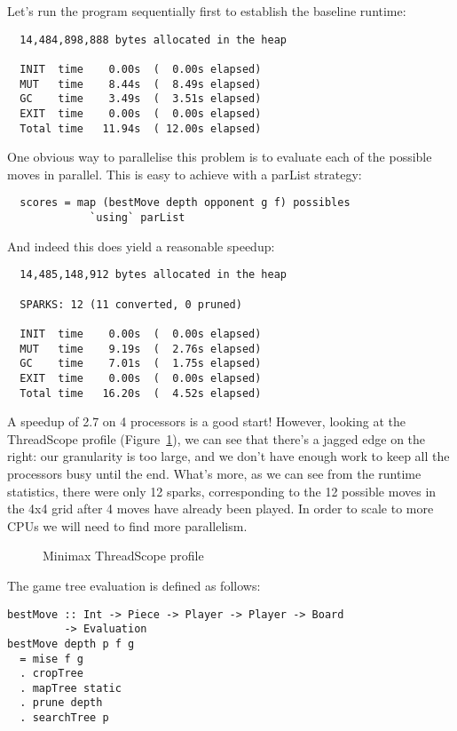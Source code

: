 \documentclass[twocolumn,9pt]{sigplanconf}
\newcommand{\codef}[1]{{\fontfamily{cmss}\small#1}}
\begin{document}
Let's run the program sequentially first to establish the baseline
runtime:

\begin{verbatim}
  14,484,898,888 bytes allocated in the heap

  INIT  time    0.00s  (  0.00s elapsed)
  MUT   time    8.44s  (  8.49s elapsed)
  GC    time    3.49s  (  3.51s elapsed)
  EXIT  time    0.00s  (  0.00s elapsed)
  Total time   11.94s  ( 12.00s elapsed)
\end{verbatim}

One obvious way to parallelise this problem is to evaluate each of the
possible moves in parallel.  This is easy to achieve with a
\codef{parList} strategy:

\begin{lstlisting}
  scores = map (bestMove depth opponent g f) possibles
             `using` parList
\end{lstlisting}

And indeed this does yield a reasonable speedup:

\begin{verbatim}
  14,485,148,912 bytes allocated in the heap

  SPARKS: 12 (11 converted, 0 pruned)

  INIT  time    0.00s  (  0.00s elapsed)
  MUT   time    9.19s  (  2.76s elapsed)
  GC    time    7.01s  (  1.75s elapsed)
  EXIT  time    0.00s  (  0.00s elapsed)
  Total time   16.20s  (  4.52s elapsed)
\end{verbatim}

A speedup of 2.7 on 4 processors is a good start!  However, looking at
the ThreadScope profile (Figure~\ref{f:minimax-threadscope1}), we can
see that there's a jagged edge on the right: our granularity is too
large, and we don't have enough work to keep all the processors busy
until the end.  What's more, as we can see from the runtime
statistics, there were only 12 sparks, corresponding to the 12
possible moves in the 4x4 grid after 4 moves have already been played.
In order to scale to more CPUs we will need to find more parallelism.

\begin{figure}
\caption{Minimax ThreadScope profile}
\label{f:minimax-threadscope1}
\end{figure}

The game tree evaluation is defined as follows:

\begin{lstlisting}
bestMove :: Int -> Piece -> Player -> Player -> Board
         -> Evaluation
bestMove depth p f g 
  = mise f g 
  . cropTree
  . mapTree static
  . prune depth
  . searchTree p
\end{lstlisting}
\end{document}
